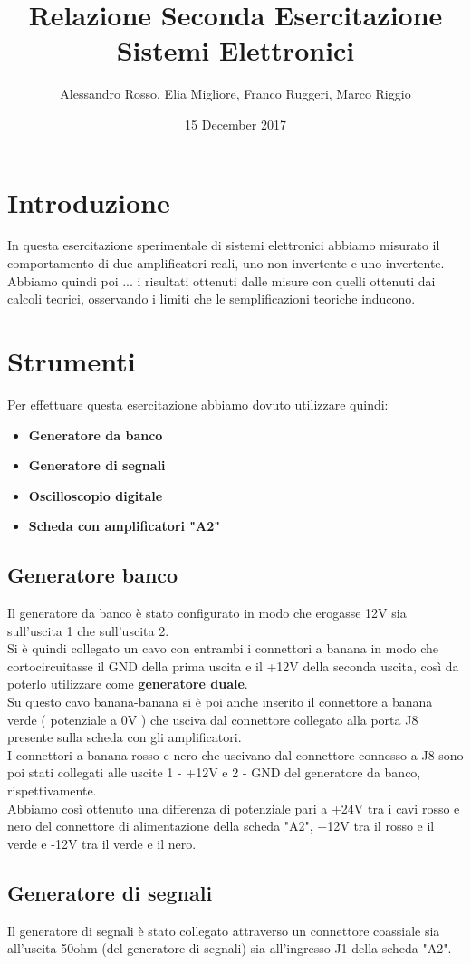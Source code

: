 \documentclass{article}
\author{Alessandro Rosso, Elia Migliore, Franco Ruggeri, Marco Riggio}
\title{Relazione Seconda Esercitazione Sistemi Elettronici}
\date{15 December 2017}
\begin{document}
\section{Introduzione}
In questa esercitazione sperimentale di sistemi elettronici abbiamo misurato il comportamento di due amplificatori reali, uno non invertente e uno invertente.\\Abbiamo quindi poi ... i risultati ottenuti dalle misure con quelli ottenuti dai calcoli teorici, osservando i limiti che le semplificazioni teoriche inducono.

\section{Strumenti}
Per effettuare questa esercitazione abbiamo dovuto utilizzare quindi:
\begin{itemize}
	\item \textbf{Generatore da banco}
	\item \textbf{Generatore di segnali}
    \item \textbf{Oscilloscopio digitale}
	\item \textbf{Scheda con amplificatori "A2"}
\end{itemize}

\subsection{Generatore banco}
Il generatore da banco è stato configurato in modo che erogasse 12V sia sull'uscita 1 che sull'uscita 2.\\
Si è quindi collegato un cavo con entrambi i connettori a banana in modo che cortocircuitasse il GND della prima uscita e il +12V della seconda uscita, così da poterlo utilizzare come \textbf{generatore duale}.\\ Su questo cavo banana-banana si è poi anche inserito il connettore a banana verde ( potenziale a 0V ) che usciva dal connettore collegato alla porta J8 presente sulla scheda con gli amplificatori.\\
I connettori a banana rosso e nero che uscivano dal connettore connesso a J8 sono poi stati collegati alle uscite 1 - +12V e 2 - GND del generatore da banco, rispettivamente.\\
Abbiamo così ottenuto una differenza di potenziale pari a +24V tra i cavi rosso e nero del connettore di alimentazione della scheda "A2", +12V tra il rosso e il verde e -12V tra il verde e il nero.

\subsection{Generatore di segnali}
Il generatore di segnali è stato collegato attraverso un connettore coassiale sia all'uscita 50ohm (del generatore di segnali) sia all'ingresso J1 della scheda "A2".
\end{document}
